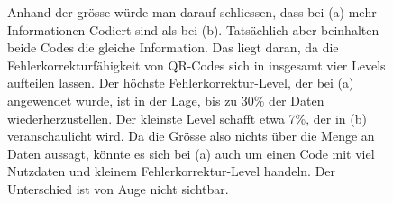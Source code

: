 %
%

\begin{figure}
	\centering
	\caption{Anhand der grösse würde man darauf schliessen, dass bei (a) mehr Informationen Codiert sind als bei (b). Tatsächlich aber beinhalten beide Codes die gleiche Information. Das liegt daran, da die Fehlerkorrekturfähigkeit von QR-Codes sich in insgesamt vier Levels aufteilen lassen. Der höchste Fehlerkorrektur-Level, der bei (a) angewendet wurde, ist in der Lage, bis zu 30\% der Daten wiederherzustellen. Der kleinste Level schafft etwa 7\%, der in (b) veranschaulicht wird. Da die Grösse also nichts über die Menge an Daten aussagt, könnte es sich bei (a) auch um einen Code mit viel Nutzdaten und kleinem Fehlerkorrektur-Level handeln. Der Unterschied ist von Auge nicht sichtbar.}
	\label{fig:qr}
\end{figure}

